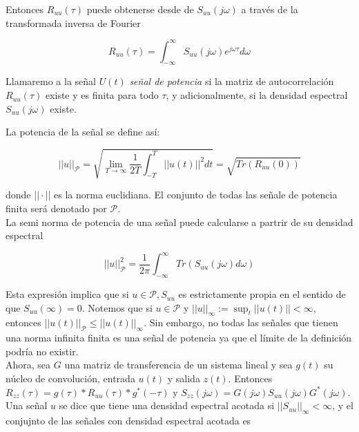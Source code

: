 Entonces $ R_{uu}(\tau)$ puede obtenerse desde de $ S_{uu}(j\omega)$  a través de la transformada inversa de Fourier

\begin{equation*}
     R_{uu}(\tau) =  \int_{-\infty}^{\infty}  S_{uu}(j\omega)e^{j \omega \tau} d \omega
\end{equation*}

Llamaremo a la señal $U(t)$ \textit{señal de potencia} si la matriz de autocorrelación $ R_{uu}(\tau)$ existe y es finita para todo $\tau$, y adicionalmente, si la densidad espectral $ S_{uu}(j\omega)$ existe.

La potencia de la señal se define así:

\begin{equation*}
    ||u||_{\mathcal{P}} = \sqrt{ \lim_{T \to \infty} \frac{1}{2T}\int_{-T}^{T} ||u(t)||^2 dt } = \sqrt{Tr(R_{uu}(0))}
\end{equation*}

donde $||\cdot||$ es la norma euclidiana.  El conjunto de todas las señale de potencia finita será denotado por $\mathcal{P}$. \\

La semi norma de potencia de una señal puede calcularse a partrir de su densidad espectral

\begin{equation*}
    ||u||_{\mathcal{P}}^2 =  \frac{1}{2\pi} \int_{-\infty}^{\infty}Tr( S_{uu}(j\omega) d \omega)
\end{equation*}

Esta expresión implica que si $u \in \mathcal{P}, S_{uu}$ es estrictamente propia en el sentido de que $ S_{uu}(\infty) = 0$. Notemos que si $u \in \mathcal{P}$ y $||u||_{\infty} := \sup_{t}||u(t)|| < \infty$, entonces $||u(t)||_{\mathcal{P}} \leq ||u(t)||_{\infty} $. Sin embargo, no todas las señales que tienen una norma infinita finita es una señal de potencia ya que el límite de la definición podría no existir. \\

Ahora, sea $G$ una matriz de transferencia de un sistema lineal y sea $g(t)$ su núcleo de convolución, entrada $u(t)$ y salida $z(t)$. Entonces $R_{zz}(\tau) = g(\tau) * R_{uu}(\tau) * g^{*}(- \tau)$ y $S_{zz}(j \omega) = G(j \omega) S_{uu}(j \omega)G^{*}(j \omega)$. \\

Una señal $u$ se dice que tiene una densidad espectral acotada si $|| S_{uu}||_{\infty} < \infty$, y el conjujnto de las señales con densidad espectral acotada es

